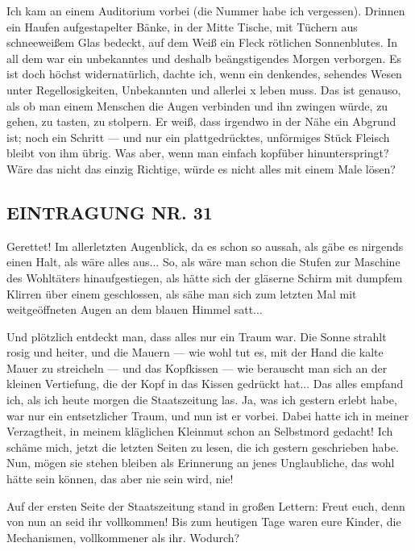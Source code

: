 Ich kam an einem Auditorium vorbei (die Nummer habe ich vergessen).
Drinnen ein Haufen aufgestapelter Bänke, in der Mitte Tische, mit
Tüchern aus schneeweißem Glas bedeckt, auf dem Weiß ein Fleck
rötlichen Sonnenblutes. In all dem war ein unbekanntes und deshalb
beängstigendes Morgen verborgen. Es ist doch höchst widernatürlich,
dachte ich, wenn ein denkendes, sehendes Wesen unter
Regellosigkeiten, Unbekannten und allerlei x leben muss. Das ist
genauso, als ob man einem Menschen die Augen verbinden und ihn
zwingen würde, zu gehen, zu tasten, zu stolpern. Er weiß, dass
irgendwo in der Nähe ein Abgrund ist; noch ein Schritt — und nur
ein plattgedrücktes, unförmiges Stück Fleisch bleibt von ihm übrig.
Was aber, wenn man einfach kopfüber hinunterspringt? Wäre das nicht
das einzig Richtige, würde es nicht alles mit einem Male lösen?

\subsection{EINTRAGUNG NR. 31}

Gerettet! Im allerletzten Augenblick, da es schon so aussah, als
gäbe es nirgends einen Halt, als wäre alles aus... So, als wäre man
schon die Stufen zur Maschine des Wohltäters hinaufgestiegen, als
hätte sich der gläserne Schirm mit dumpfem Klirren über einem
geschlossen, als sähe man sich zum letzten Mal mit weitgeöffneten
Augen an dem blauen Himmel satt...

Und plötzlich entdeckt man, dass alles nur ein Traum war. Die Sonne
strahlt rosig und heiter, und die Mauern — wie wohl tut es, mit der
Hand die kalte Mauer zu streicheln — und das Kopfkissen — wie
berauscht man sich an der kleinen Vertiefung, die der Kopf in das
Kissen gedrückt hat... Das alles empfand ich, als ich heute morgen
die Staatszeitung las. Ja, was ich gestern erlebt habe, war nur ein
entsetzlicher Traum, und nun ist er vorbei. Dabei hatte ich in
meiner Verzagtheit, in meinem kläglichen Kleinmut schon an
Selbstmord gedacht! Ich schäme mich, jetzt die letzten Seiten zu
lesen, die ich gestern geschrieben habe. Nun, mögen sie stehen
bleiben als Erinnerung an jenes Unglaubliche, das wohl hätte sein
können, das aber nie sein wird, nie!

Auf der ersten Seite der Staatszeitung stand in großen Lettern:
Freut euch, denn von nun an seid ihr vollkommen! Bis zum heutigen
Tage waren eure Kinder, die Mechanismen, vollkommener als ihr.
Wodurch?

